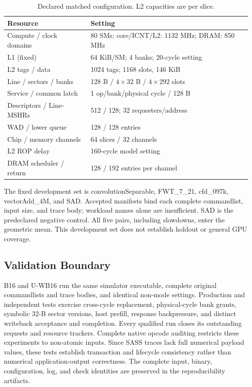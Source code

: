 \documentclass[conference,letterpaper]{IEEEtran}
\begin{document}
\begin{table}[t]
\caption{Declared matched configuration. L2 capacities are per slice.}
\label{tab:configuration}\centering\footnotesize
\begin{tabularx}{\columnwidth}{@{}L{.42\columnwidth}X@{}}
\toprule
Resource & Setting \\
\midrule
Compute / clock domains & 80 SMs; core/ICNT/L2: 1132 MHz; DRAM: 850 MHz \\
L1 (fixed) & 64 KiB/SM; 4 banks; 20-cycle setting \\
L2 tags / data & 1024 tags; 1168 slots, 146 KiB \\
Line / sectors / banks & 128 B / $4\times32$ B / $4\times292$ slots \\
Service / common latch & 1 op/bank/physical cycle / 128 B \\
Descriptors / Line-MSHRs & 512 / 128; 32 requesters/address \\
WAD / lower queue & 128 / 128 entries \\
Chip / memory channels & 64 slices / 32 channels \\
L2 ROP delay & 160-cycle model setting \\
DRAM scheduler / return & 128 / 192 entries per channel \\
\bottomrule
\end{tabularx}
\end{table}

The fixed development set is convolutionSeparable, FWT\_7\_21, cfd\_097k, vectorAdd\_4M, and SAD. Accepted manifests bind each complete commandlist, input size, and trace body; workload names alone are insufficient. SAD is the predeclared negative control. All five pairs, including slowdowns, enter the geometric mean. This development set does not establish holdout or general GPU coverage.

\subsection{Validation Boundary}
B16 and U-WB16 run the same simulator executable, complete original commandlists and trace bodies, and identical non-mode settings. Production and independent tests exercise cross-cycle replacement, physical-cycle bank grants, symbolic 32-B sector versions, host prefill, response backpressure, and distinct writeback acceptance and completion. Every qualified run closes its outstanding requests and resource trackers. Complete native opcode auditing restricts these experiments to non-atomic inputs. Since SASS traces lack full numerical payload values, these tests establish transaction and lifecycle consistency rather than numerical application-output correctness. The complete input, binary, configuration, log, and check identities are preserved in the reproducibility artifacts.
\end{document}

